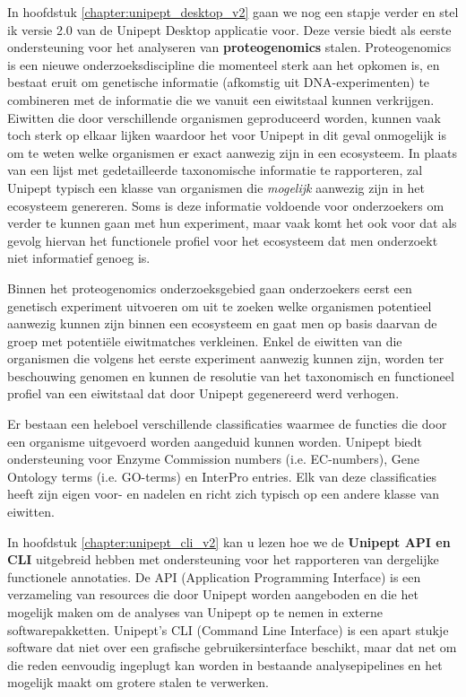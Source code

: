 In hoofdstuk \ref{chapter:unipept_desktop_v2} gaan we nog een stapje verder en stel ik versie 2.0 van de Unipept Desktop applicatie voor.
Deze versie biedt als eerste ondersteuning voor het analyseren van \textbf{proteogenomics} stalen.
Proteogenomics is een nieuwe onderzoeksdiscipline die momenteel sterk aan het opkomen is, en bestaat eruit om genetische informatie (afkomstig uit DNA-experimenten) te combineren met de informatie die we vanuit een eiwitstaal kunnen verkrijgen.
Eiwitten die door verschillende organismen geproduceerd worden, kunnen vaak toch sterk op elkaar lijken waardoor het voor Unipept in dit geval onmogelijk is om te weten welke organismen er exact aanwezig zijn in een ecosysteem.
In plaats van een lijst met gedetailleerde taxonomische informatie te rapporteren, zal Unipept typisch een klasse van organismen die \textit{mogelijk} aanwezig zijn in het ecosysteem genereren.
Soms is deze informatie voldoende voor onderzoekers om verder te kunnen gaan met hun experiment, maar vaak komt het ook voor dat als gevolg hiervan het functionele profiel voor het ecosysteem dat men onderzoekt niet informatief genoeg is.

Binnen het proteogenomics onderzoeksgebied gaan onderzoekers eerst een genetisch experiment uitvoeren om uit te zoeken welke organismen potentieel aanwezig kunnen zijn binnen een ecosysteem en gaat men op basis daarvan de groep met potentiële eiwitmatches verkleinen.
Enkel de eiwitten van die organismen die volgens het eerste experiment aanwezig kunnen zijn, worden ter beschouwing genomen en kunnen de resolutie van het taxonomisch en functioneel profiel van een eiwitstaal dat door Unipept gegenereerd werd verhogen.

Er bestaan een heleboel verschillende classificaties waarmee de functies die door een organisme uitgevoerd worden aangeduid kunnen worden.
Unipept biedt ondersteuning voor Enzyme Commission numbers (i.e. EC-numbers), Gene Ontology terms (i.e. GO-terms) en InterPro entries.
Elk van deze classificaties heeft zijn eigen voor- en nadelen en richt zich typisch op een andere klasse van eiwitten.

In hoofdstuk \ref{chapter:unipept_cli_v2} kan u lezen hoe we de \textbf{Unipept API en CLI} uitgebreid hebben met ondersteuning voor het rapporteren van dergelijke functionele annotaties.
De API (Application Programming Interface) is een verzameling van resources die door Unipept worden aangeboden en die het mogelijk maken om de analyses van Unipept op te nemen in externe softwarepakketten.
Unipept's CLI (Command Line Interface) is een apart stukje software dat niet over een grafische gebruikersinterface beschikt, maar dat net om die reden eenvoudig ingeplugt kan worden in bestaande analysepipelines en het mogelijk maakt om grotere stalen te verwerken.

